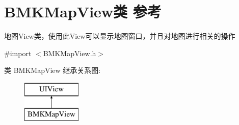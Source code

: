 \hypertarget{interface_b_m_k_map_view}{}\section{B\+M\+K\+Map\+View类 参考}
\label{interface_b_m_k_map_view}


地图\+View类，使用此\+View可以显示地图窗口，并且对地图进行相关的操作  




{\ttfamily \#import $<$B\+M\+K\+Map\+View.\+h$>$}

类 B\+M\+K\+Map\+View 继承关系图\+:\begin{figure}[H]
\begin{center}
\leavevmode
\includegraphics[height=2.000000cm]{interface_b_m_k_map_view}
\end{center}
\end{figure}
